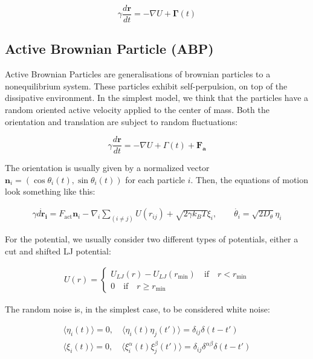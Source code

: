 \documentclass[a4paper]{article}
\begin{document}
\begin{equation}
	\gamma\frac{d \mathbf{r}}{dt} = -\nabla U + \mathbf{\Gamma}(t)
\end{equation}

\subsection{Active Brownian Particle (ABP)}

Active Brownian Particles are generalisations of brownian particles to a nonequilibrium system. These particles exhibit self-perpulsion, on top of the dissipative environment. In the simplest model, we think that the particles have a random oriented active velocity applied to the center of mass. Both the orientation and translation are subject to random fluctuations:

\begin{equation}
	\gamma \frac{d \mathbf{r}}{dt} = -\nabla U + \Gamma(t) + \mathbf{F_a}
\end{equation}

The orientation is usually given by a normalized vector $\mathbf{n}_i = (\cos \theta_i(t),\sin \theta_i(t))$ for each particle $i$. Then, the equations of motion look something like this:

\begin{align}
	\gamma \dot{d\mathbf{r_i}} = F_\text{act}\mathbf{n}_i - \nabla_i \sum_{(i\neq j)} U(r_{ij}) + \sqrt{2\gamma k_B T}\xi_i,\qquad \dot{\theta_i} = \sqrt{2D_\theta }\eta_i
\end{align}

For the potential, we usually consider two different types of potentials, either a cut and shifted LJ potential:

\begin{align}
	U(r)=
	\begin{cases}
		U_{LJ}(r)-U_{LJ}(r_\text{min}) \quad \text{if} \quad r<r_\text{min}\\
		0 \quad \text{if} \quad r\geq r_\text{min}
	\end{cases}
\end{align}

The random noise is, in the simplest case, to be considered white noise:

\begin{align}
	\langle\eta_i(t)\rangle= 0,\quad \langle \eta_i(t)\eta_j(t')\rangle = \delta_{ij}\delta(t-t')\\
	\langle\xi_i(t)\rangle= 0,\quad \langle\xi^\alpha_i(t)\xi^\beta_j(t')\rangle=\delta_{ij}\delta^{\alpha\beta}\delta(t-t')
\end{align}
\end{document}

